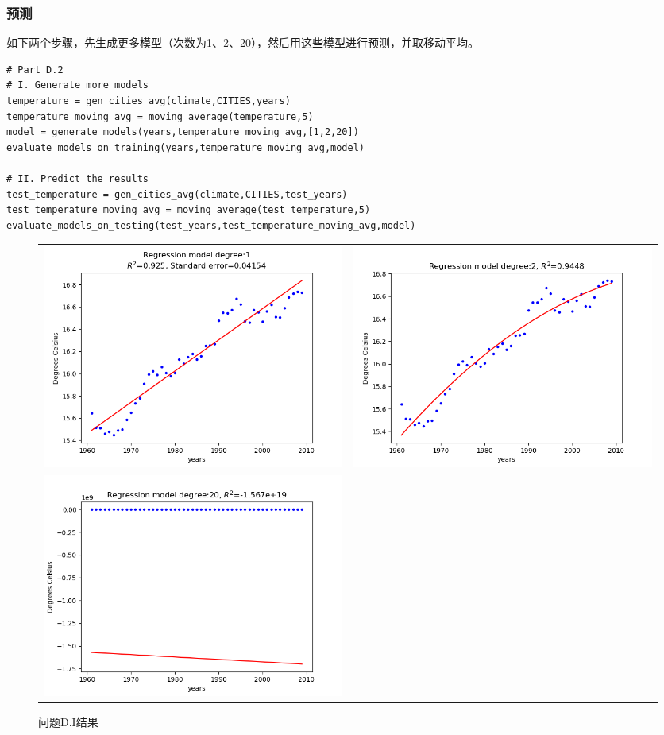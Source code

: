 \documentclass[logo,reportComp]{thesis}
\begin{document}
\subsubsection{预测}
如下两个步骤，先生成更多模型（次数为1、2、20），然后用这些模型进行预测，并取移动平均。
\begin{lstlisting}
# Part D.2
# I. Generate more models
temperature = gen_cities_avg(climate,CITIES,years)
temperature_moving_avg = moving_average(temperature,5)
model = generate_models(years,temperature_moving_avg,[1,2,20])
evaluate_models_on_training(years,temperature_moving_avg,model)

# II. Predict the results
test_temperature = gen_cities_avg(climate,CITIES,test_years)
test_temperature_moving_avg = moving_average(test_temperature,5)
evaluate_models_on_testing(test_years,test_temperature_moving_avg,model)
\end{lstlisting}

\begin{figure}[H]
\centering
\begin{tabular}{cc}
\includegraphics[width=0.5\linewidth]{fig/DI-1.png}&
\includegraphics[width=0.5\linewidth]{fig/DI-2.png}\\
\includegraphics[width=0.5\linewidth]{fig/DI-3.png}
\end{tabular}
\caption{问题D.I结果}
\end{figure}
\end{document}
